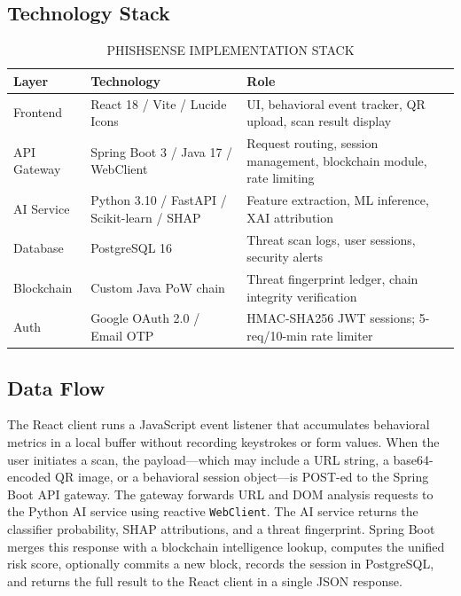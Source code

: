 \documentclass[conference]{IEEEtran}
\begin{document}
\subsection{Technology Stack}
\begin{table}[!t]
\caption{PHISHSENSE IMPLEMENTATION STACK}
\label{tab:stack}
\centering
\scriptsize
\setlength{\tabcolsep}{3pt}
\begin{tabularx}{\columnwidth}{|>{\raggedright\arraybackslash}p{}|>{\raggedright\arraybackslash}p{}|>{\raggedright\arraybackslash}X|}
\hline
\textbf{Layer} & \textbf{Technology} & \textbf{Role} \\ \hline
Frontend     & React 18 / Vite / Lucide Icons  & UI, behavioral event tracker, QR upload, scan result display \\ \hline
API Gateway  & Spring Boot 3 / Java 17 / WebClient & Request routing, session management, blockchain module, rate limiting \\ \hline
AI Service   & Python 3.10 / FastAPI / Scikit-learn / SHAP & Feature extraction, ML inference, XAI attribution \\ \hline
Database     & PostgreSQL 16                   & Threat scan logs, user sessions, security alerts \\ \hline
Blockchain   & Custom Java PoW chain           & Threat fingerprint ledger, chain integrity verification \\ \hline
Auth         & Google OAuth 2.0 / Email OTP    & HMAC-SHA256 JWT sessions; 5-req/10-min rate limiter \\ \hline
\end{tabularx}
\end{table}

\subsection{Data Flow}
The React client runs a JavaScript event listener that accumulates behavioral metrics in a local
buffer without recording keystrokes or form values.
When the user initiates a scan, the payload---which may include a URL string, a base64-encoded
QR image, or a behavioral session object---is POST-ed to the Spring Boot API gateway.
The gateway forwards URL and DOM analysis requests to the Python AI service using reactive
\texttt{WebClient}.
The AI service returns the classifier probability, SHAP attributions, and a threat fingerprint.
Spring Boot merges this response with a blockchain intelligence lookup, computes the unified risk
score, optionally commits a new block, records the session in PostgreSQL, and returns the full
result to the React client in a single JSON response.
\end{document}
